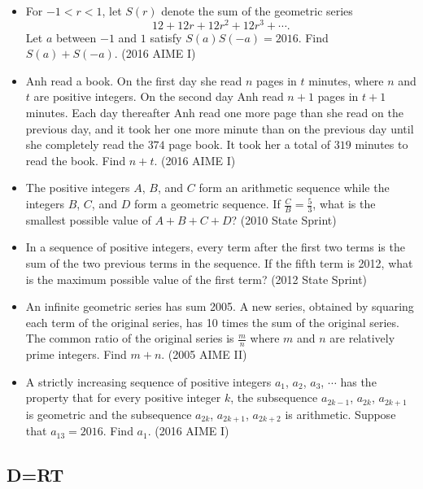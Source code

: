 \documentclass{article}
\begin{document}
\begin{itemize}
\item For $-1<r<1$, let $S(r)$ denote the sum of the geometric series $$12+12r+12r^2+12r^3+\cdots .$$  Let $a$ between $-1$ and $1$ satisfy $S(a)S(-a)=2016$. Find $S(a)+S(-a)$. (2016 AIME I)

\item Anh read a book. On the first day she read $n$ pages in $t$ minutes, where $n$ and $t$ are positive integers. On the second day Anh read $n + 1$ pages in $t + 1$ minutes. Each day thereafter Anh read one more page than she read on the previous day, and it took her one more minute than on the previous day until she completely read the $374$ page book. It took her a total of $319$ minutes to read the book. Find $n + t$. (2016 AIME I)

\item The positive integers $A$, $B$, and $C$ form an arithmetic sequence while the integers $B$, $C$, and $D$ form a geometric sequence. If $\frac{C}{B}=\frac{5}{3}$, what is the smallest possible value of $A+B+C+D$? (2010 State Sprint)

\item In a sequence of positive integers, every term after the first two terms is the sum of the two previous terms in the sequence. If the fifth term is 2012, what is the maximum possible value of the first term? (2012 State Sprint)

\item An infinite geometric series has sum 2005. A new series, obtained by squaring each term of the original series, has 10 times the sum of the original series. The common ratio of the original series is $\frac{m}{n}$ where $m$ and $n$ are relatively prime integers. Find $m+n$. (2005 AIME II)

\item A strictly increasing sequence of positive integers $a_1$, $a_2$, $a_3$, $\cdots$ has the property that for every positive integer $k$, the subsequence $a_{2k-1}$, $a_{2k}$, $a_{2k+1}$ is geometric and the subsequence $a_{2k}$, $a_{2k+1}$, $a_{2k+2}$ is arithmetic. Suppose that $a_{13} = 2016$. Find $a_1$. (2016 AIME I)

\end{itemize}

\subsection{D=RT}
\end{document}
